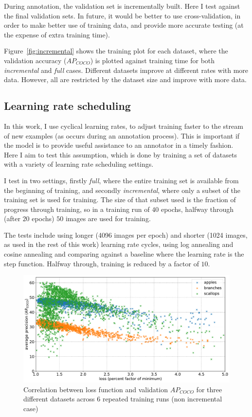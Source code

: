 During annotation, the validation set is incrementally built. Here I test against the final validation sets. In future, it would be better to use cross-validation, in order to make better use of training data, and provide more accurate testing (at the expense of extra training time). 

Figure~\ref{fig:incremental} shows the training plot for each dataset, where the validation accuracy ($AP_{COCO}$) is plotted against training time for both \emph{incremental} and \emph{full} cases. Different datasets improve at different rates with more data. However, all are restricted by the dataset size and improve with more data.

\subsection {Learning rate scheduling}
\label{sec:lr_schedule_exp}

In this work, I use cyclical learning rates, to adjust training faster to the stream of new examples (as occurs during an annotation process). This is important if the model is to provide useful assistance to an annotator in a timely fashion. Here I aim to test this assumption, which is done by training a set of datasets with a variety of learning rate scheduling settings. 

I test in two settings, firstly \emph{full}, where the entire training set is available from the beginning of training, and secondly \emph{incremental}, where only a subset of the training set is used for training. The size of that subset used is the fraction of progress through training, so in a training run of $40$ epochs, halfway through (after $20$ epochs) $50$ images are used for training. 

The tests include using longer (4096 images per epoch) and shorter (1024 images, as used in the rest of this work) learning rate cycles, using log annealing and cosine annealing and comparing against a baseline where the learning rate is the step function. Halfway through, training is reduced by a factor of $10$.

\begin{figure}[h]
  \centering
  \includegraphics[width=1.0\linewidth]{charts/training/lr_schedule/scatter_loss_ap.pdf}
  \caption{Correlation between loss function and validation $AP_{COCO}$ for three different datasets across 6 repeated training runs (non incremental case)}  
  \label{fig:scatter_loss_ap}
\end{figure}

